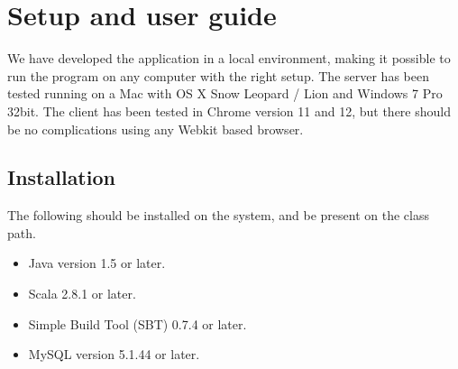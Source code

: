\section{Setup and user guide}
\label{sec:setup_and_use}
We have developed the application in a local environment, making it possible to run the program on any computer with the right setup. The server has been tested running on a Mac with OS X Snow Leopard / Lion and Windows 7 Pro 32bit. The client has been tested in Chrome version 11 and 12, but there should be no complications using any Webkit based browser.\\

\subsection{Installation}
The following should be installed on the system, and be present on the class path. 

\begin{itemize}
	\item Java version 1.5 or later.
	\item Scala 2.8.1 or later.
	\item Simple Build Tool (SBT) 0.7.4 or later.
	\item MySQL version 5.1.44 or later.
\end{itemize}

